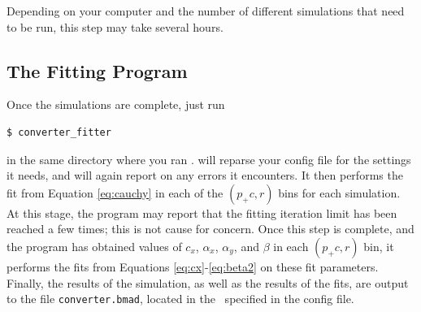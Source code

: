 \documentclass[12pt]{article}
\begin{document}
Depending on your computer and the number of different simulations that need to be run, this step may take several hours.


\subsection{The Fitting Program}

Once the simulations are complete, just run
\begin{verbatim}
$ converter_fitter
\end{verbatim}
in the same directory where you ran \exes.
\exef will reparse your config file for the settings it needs, and will again report on any errors it encounters.
It then performs the fit from Equation \ref{eq:cauchy} in each of the $(p_+c, r)$ bins for each simulation.
At this stage, the program may report that the fitting iteration limit has been reached a few times; this is not cause for concern.
Once this step is complete, and the program has obtained values of $c_x$, $\alpha_x$, $\alpha_y$, and $\beta$ in each $(p_+c, r)$ bin,
it performs the fits from Equations \ref{eq:cx}-\ref{eq:beta2} on these fit parameters.
Finally, the results of the simulation, as well as the results of the fits, are output to the file \texttt{converter.bmad}, located in the \outdir \, specified in the config file.









\printbibliography
\end{document}
